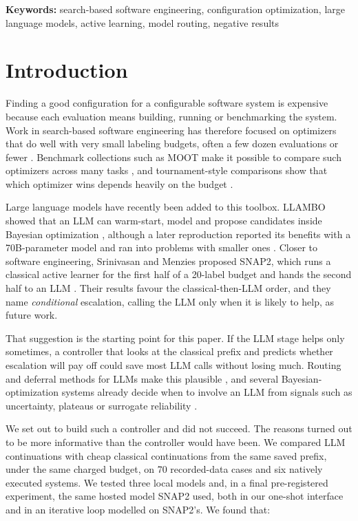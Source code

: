 \noindent\textbf{Keywords:} search-based software engineering, configuration optimization, large language models, active learning, model routing, negative results

\section{Introduction}

Finding a good configuration for a configurable software system is expensive because each evaluation means building, running or benchmarking the system. Work in search-based software engineering has therefore focused on optimizers that do well with very small labeling budgets, often a few dozen evaluations or fewer \cite{harman2001sbse,nair2020flash,menzies2026ezr}. Benchmark collections such as MOOT make it possible to compare such optimizers across many tasks \cite{menzies2025moot}, and tournament-style comparisons show that which optimizer wins depends heavily on the budget \cite{ganguly2026tournament}.

Large language models have recently been added to this toolbox. LLAMBO showed that an LLM can warm-start, model and propose candidates inside Bayesian optimization \cite{liu2024llambo}, although a later reproduction reported its benefits with a 70B-parameter model and ran into problems with smaller ones \cite{rychert2025reproduction}. Closer to software engineering, Srinivasan and Menzies proposed SNAP2, which runs a classical active learner for the first half of a 20-label budget and hands the second half to an LLM \cite{srinivasan2026snap2}. Their results favour the classical-then-LLM order, and they name \emph{conditional} escalation, calling the LLM only when it is likely to help, as future work.

That suggestion is the starting point for this paper. If the LLM stage helps only sometimes, a controller that looks at the classical prefix and predicts whether escalation will pay off could save most LLM calls without losing much. Routing and deferral methods for LLMs make this plausible \cite{chen2023frugalgpt,ong2024routellm,mozannar2020defer}, and several Bayesian-optimization systems already decide when to involve an LLM from signals such as uncertainty, plateaus or surrogate reliability \cite{cisse2025bora,xu2026lbmcts,ngo2026lmabo}.

We set out to build such a controller and did not succeed. The reasons turned out to be more informative than the controller would have been. We compared LLM continuations with cheap classical continuations from the same saved prefix, under the same charged budget, on 70 recorded-data cases and six natively executed systems. We tested three local models and, in a final pre-registered experiment, the same hosted model SNAP2 used, both in our one-shot interface and in an iterative loop modelled on SNAP2's. We found that:

